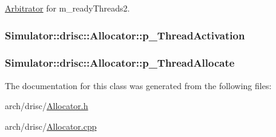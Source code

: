 \hyperlink{class_simulator_1_1_arbitrator}{Arbitrator} for m\+\_\+ready\+Threads2. 

\hypertarget{class_simulator_1_1drisc_1_1_allocator_a86ba51d9defcde72c57eb52ebfbb9d1f}{
\subsubsection[{p\+\_\+\+Thread\+Activation}]{ Simulator\+::drisc\+::\+Allocator\+::p\+\_\+\+Thread\+Activation}}\label{class_simulator_1_1drisc_1_1_allocator_a86ba51d9defcde72c57eb52ebfbb9d1f}
\hypertarget{class_simulator_1_1drisc_1_1_allocator_a76447246986a86eda057380a359b0a61}{
\subsubsection[{p\+\_\+\+Thread\+Allocate}]{ Simulator\+::drisc\+::\+Allocator\+::p\+\_\+\+Thread\+Allocate}}\label{class_simulator_1_1drisc_1_1_allocator_a76447246986a86eda057380a359b0a61}


The documentation for this class was generated from the following files\+:\begin{DoxyCompactItemize}
\item 
arch/drisc/\hyperlink{_allocator_8h}{Allocator.\+h}\item 
arch/drisc/\hyperlink{_allocator_8cpp}{Allocator.\+cpp}\end{DoxyCompactItemize}
